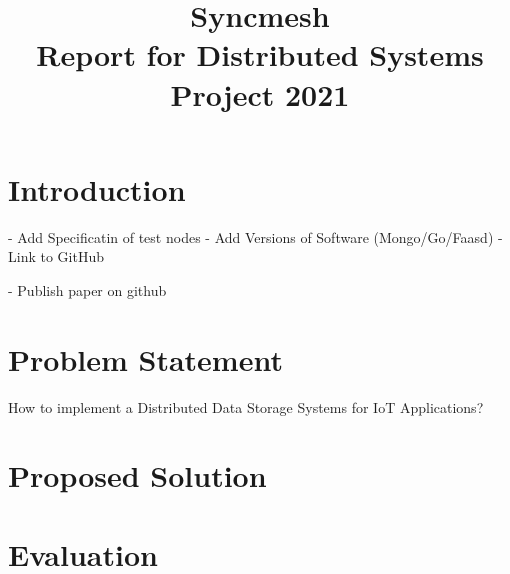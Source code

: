 \documentclass[conference]{IEEEtran}
\begin{document}
\title{Syncmesh\\
{\footnotesize Report for Distributed Systems Project 2021}
}

\author{
\and
{}
\and
{}
}

\maketitle

\begin{abstract}

\end{abstract}



\section{Introduction}

- Add Specificatin of test nodes
- Add Versions of Software (Mongo/Go/Faasd)
- Link to GitHub 

- Publish paper on github

\section{Problem Statement}\label{Chap:Problem}
How to implement a Distributed Data Storage Systems for IoT Applications? 




\section{Proposed Solution}\label{Chap:Solution}
\blindtext



\section{Evaluation}\label{Chap:Eva}
\blindtext
\end{document}
